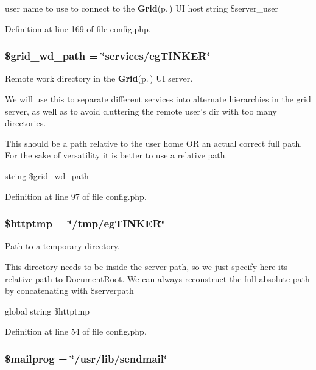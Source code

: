user name to use to connect to the {\bf Grid}{\rm (p.\,\pageref{classGrid})} UI host  string \$server\_\-user 



Definition at line 169 of file config.php.
\subsubsection{\setlength{\rightskip}{0pt plus 5cm}\$grid\_\-wd\_\-path = \char`\"{}services/eg\-TINKER\char`\"{}}\label{config_8php_a6}


Remote work directory in the {\bf Grid}{\rm (p.\,\pageref{classGrid})} UI server. 

We will use this to separate different services into alternate hierarchies in the grid server, as well as to avoid cluttering the remote user's dir with too many directories.

This should be a path relative to the user home OR an actual correct full path. For the sake of versatility it is better to use a relative path.

string \$grid\_\-wd\_\-path 

Definition at line 97 of file config.php.
\subsubsection{\setlength{\rightskip}{0pt plus 5cm}\$httptmp = \char`\"{}/tmp/eg\-TINKER\char`\"{}}\label{config_8php_a4}


Path to a temporary directory. 

This directory needs to be inside the server path, so we just specify here its relative path to Document\-Root. We can always reconstruct the full absolute path by concatenating with \$serverpath

global string \$httptmp 

Definition at line 54 of file config.php.
\subsubsection{\setlength{\rightskip}{0pt plus 5cm}\$mailprog = \char`\"{}/usr/lib/sendmail\char`\"{}}\label{config_8php_a13}


